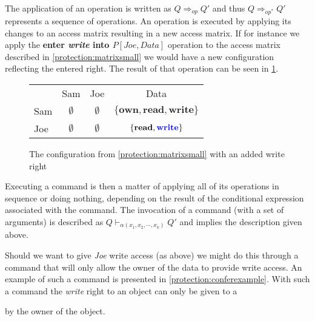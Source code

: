 The application of an operation is written as $Q \Rightarrow_{op} Q'$ and thus $Q \Rightarrow_{op^*} Q'$ represents a sequence of operations.
An operation is executed by applying its changes to an access matrix resulting in a new access matrix.
If for instance we apply the \textbf{enter \textit{write} into $P[Joe, Data]$} operation to the access matrix described in \cref{protection:matrixsmall} we would have a new configuration reflecting the entered right.
The result of that operation can be seen in \cref{protection:matrixwithwrite}.

\begin{figure}
\centering
\begin{tabular}{l|c|c|c|}
\multicolumn{1}{c}{} & \multicolumn{1}{c}{Sam} & \multicolumn{1}{c}{Joe} & \multicolumn{1}{c}{Data} \\\cline{2-4}
Sam & $\emptyset$ & $\emptyset$ & $\{\textbf{own}, \textbf{read}, \textbf{write}\}$ \\\cline{2-4}
Joe & $\emptyset$ & $\emptyset$ & $\{\textbf{read}, {\color{blue}\textbf{write}}\}$ \\\cline{2-4}
\end{tabular}
\caption{The configuration from \cref{protection:matrixsmall} with an added write right}
\label{protection:matrixwithwrite}
\end{figure}

Executing a command is then a matter of applying all of its operations in sequence or doing nothing, depending on the result of the conditional expression associated with the command.
The invocation of a command (with a set of arguments) is described as $Q \vdash_{\alpha(x_1, x_2, \cdots, x_k)} Q'$ and implies the description given above.

Should we want to give \textit{Joe} write access (as above) we might do this through a command that will only allow the owner of the data to provide write access.
An example of such a command is presented in \cref{protection:conferexample}.
With such a command the \textit{write} right to an object can only be given to a \subject{} by the owner of the object.


